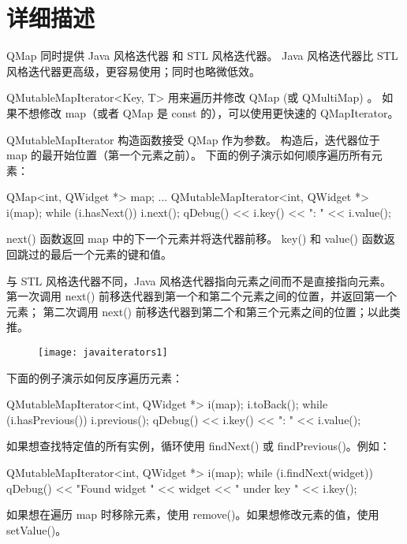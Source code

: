 \section{详细描述}

QMap 同时提供 Java 风格迭代器 和 STL 风格迭代器。
Java 风格迭代器比 STL 风格迭代器更高级，更容易使用；同时也略微低效。

QMutableMapIterator<Key, T> 用来遍历并修改 QMap (或 QMultiMap) 。
如果不想修改 map（或者 QMap 是 const 的），可以使用更快速的 QMapIterator。

QMutableMapIterator 构造函数接受 QMap 作为参数。
构造后，迭代器位于 map 的最开始位置（第一个元素之前）。
下面的例子演示如何顺序遍历所有元素：

\begin{cppcode}
QMap<int, QWidget *> map;
...
QMutableMapIterator<int, QWidget *> i(map);
while (i.hasNext()) {
    i.next();
    qDebug() << i.key() << ": " << i.value();
}
\end{cppcode}

next() 函数返回 map 中的下一个元素并将迭代器前移。
key() 和 value() 函数返回跳过的最后一个元素的键和值。

与 STL 风格迭代器不同，Java 风格迭代器指向元素之间而不是直接指向元素。
第一次调用 next() 前移迭代器到第一个和第二个元素之间的位置，并返回第一个元素；
第二次调用 next() 前移迭代器到第二个和第三个元素之间的位置；以此类推。


\begin{figure}[hbt!]  
	\centering
    \texttt{[image: javaiterators1]}
\end{figure}


下面的例子演示如何反序遍历元素：

\begin{cppcode}
QMutableMapIterator<int, QWidget *> i(map);
i.toBack();
while (i.hasPrevious()) {
    i.previous();
    qDebug() << i.key() << ": " << i.value();
}
\end{cppcode}

如果想查找特定值的所有实例，循环使用 findNext() 或 findPrevious()。例如：

\begin{cppcode}
QMutableMapIterator<int, QWidget *> i(map);
while (i.findNext(widget)) {
    qDebug() << "Found widget " << widget << " under key "
             << i.key();
}
\end{cppcode}

如果想在遍历 map 时移除元素，使用 remove()。如果想修改元素的值，使用 setValue()。

